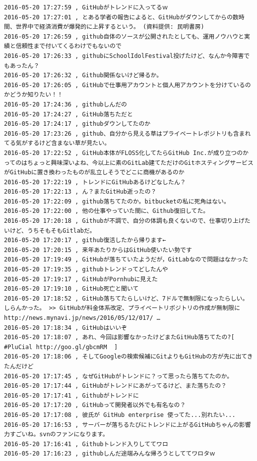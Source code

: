 \begin{verbatim}
2016-05-20 17:27:59 , GitHubがトレンドに入ってるｗ
2016-05-20 17:27:01 , とある学者の報告によると、GitHubがダウンしてからの数時間、世界中で経済消費が爆発的に上昇するという。 (資料提供: 民明書房)
2016-05-20 17:26:59 , github自体のソースが公開されたとしても、運用ノウハウと実績と信頼性まで付いてくるわけでもないので
2016-05-20 17:26:33 , githubにSchoolIdolFestival投げたけど、なんか今障害でもあったん？
2016-05-20 17:26:32 , Github関係ないけど帰るか。
2016-05-20 17:26:05 , GitHubで仕事用アカウントと個人用アカウントを分けているのかどうか知りたい！！
2016-05-20 17:24:36 , githubしんだの
2016-05-20 17:24:27 , GitHub落ちただと
2016-05-20 17:24:17 , githubダウンしてたのか
2016-05-20 17:23:26 , github、自分から見える草はプライベートレポジトリも含まれてる気がするけど含まない草が見たい。
2016-05-20 17:22:52 , GitHub本体がFLOSS化してたらGitHub Inc.が成り立つのかってのはちょっと興味深いよね、今以上に素のGitLab建てただけのGitホスティングサービスがGitHubに置き換わったものが乱立しそうでどこに商機があるのか
2016-05-20 17:22:19 , トレンドにGitHubあるけどなしたん？
2016-05-20 17:22:13 , ん？またGitHub逝ったの？
2016-05-20 17:22:09 , github落ちてたのか。bitbucketの私に死角はない。
2016-05-20 17:22:00 , 他の仕事やっていた間に、Github復旧してた。
2016-05-20 17:20:18 , Githubが不調で、自分の体調も良くないので、仕事切り上げたいけど、うちそもそもGitlabだ。
2016-05-20 17:20:17 , github復活したから帰ります←
2016-05-20 17:20:15 , 来年あたりからはGitHub使いたい勢です
2016-05-20 17:19:49 , GitHubが落ちていたようだが，GitLabなので問題はなかった
2016-05-20 17:19:35 , githubトレンドってどしたんや
2016-05-20 17:19:17 , GitHubがPornhubに見えた
2016-05-20 17:19:10 , GitHub死亡と聞いて
2016-05-20 17:18:52 , GitHub落ちてたらしいけど、7ドルで無制限になったらしい。しらんかった。 >> GitHubが料金体系改定、プライベートリポジトリの作成が無制限に http://news.mynavi.jp/news/2016/05/12/017/ …
2016-05-20 17:18:34 , GitHubはいいぞ
2016-05-20 17:18:07 , あれ、今回は影響なかったけどまたGitHub落ちてたの?[ #PluCial http://goo.gl/gbcmRM  ]
2016-05-20 17:18:06 , そしてGoogleの検索候補にGitよりもGitHubの方が先に出てきたんだけど
2016-05-20 17:17:45 , なぜGitHubがトレンドに？って思ったら落ちてたのか。
2016-05-20 17:17:44 , GitHubがトレンドにあがってるけど、また落ちたの？
2016-05-20 17:17:41 , Githubがトレンドに
2016-05-20 17:17:20 , GitHubって開発者以外でも有名なの？
2016-05-20 17:17:08 , 彼氏が GitHub enterprise 使ってた...別れたい...
2016-05-20 17:16:53 , サーバーが落ちるたびにトレンドに上がるGitHubちゃんの影響力すごいね。svnのファンになります。
2016-05-20 17:16:41 , Githubトレンド入りしててワロ
2016-05-20 17:16:23 , githubしんだ途端みんな帰ろうとしててワロタｗ

\end{verbatim}

